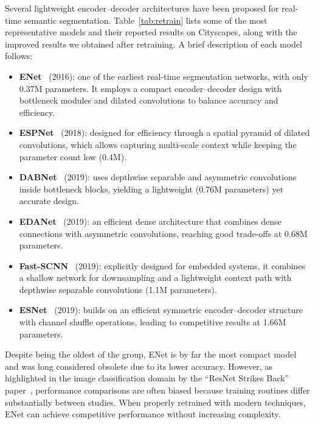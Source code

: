 \documentclass[11pt]{report}
\begin{document}
Several lightweight encoder–decoder architectures have been proposed for real-time semantic segmentation. Table~\ref{tab:retrain} lists some of the most representative models and their reported results on Cityscapes, along with the improved results we obtained after retraining. A brief description of each model follows:

\begin{itemize}
  \item \textbf{ENet}~\cite{paszke2016enet} (2016): one of the earliest real-time segmentation networks, with only 0.37M parameters. It employs a compact encoder–decoder design with bottleneck modules and dilated convolutions to balance accuracy and efficiency.
  \item \textbf{ESPNet}~\cite{mehta2018espnetefficientspatialpyramid} (2018): designed for efficiency through a spatial pyramid of dilated convolutions, which allows capturing multi-scale context while keeping the parameter count low (0.4M).
  \item \textbf{DABNet}~\cite{li2019dabnetdepthwiseasymmetricbottleneck} (2019): uses depthwise separable and asymmetric convolutions inside bottleneck blocks, yielding a lightweight (0.76M parameters) yet accurate design.
  \item \textbf{EDANet}~\cite{lo2019efficientdensemodulesasymmetric} (2019): an efficient dense architecture that combines dense connections with asymmetric convolutions, reaching good trade-offs at 0.68M parameters.
  \item \textbf{Fast-SCNN}~\cite{poudel2019fastscnnfastsemanticsegmentation} (2019): explicitly designed for embedded systems, it combines a shallow network for downsampling and a lightweight context path with depthwise separable convolutions (1.1M parameters).
  \item \textbf{ESNet}~\cite{wang2019esnetefficientsymmetricnetwork} (2019): builds on an efficient symmetric encoder–decoder structure with channel shuffle operations, leading to competitive results at 1.66M parameters.
\end{itemize}

Despite being the oldest of the group, ENet is by far the most compact model and was long considered obsolete due to its lower accuracy. However, as highlighted in the image classification domain by the ``ResNet Strikes Back'' paper~\cite{wightman2021resnet}, performance comparisons are often biased because training routines differ substantially between studies. When properly retrained with modern techniques, ENet can achieve competitive performance without increasing complexity.
\end{document}
